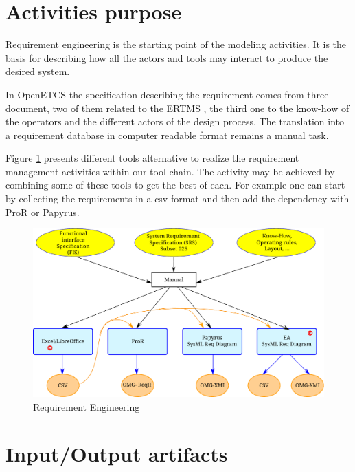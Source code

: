 \section{Activities purpose}
Requirement engineering is the starting point of the modeling
activities. It is the basis for describing how  all the actors and
tools may interact to produce the desired system. 

In OpenETCS the specification describing the requirement comes from
three document, two of them related to the \gls{ERTMS}
\cite{unisig_subset-026_2012,unisig_subset-034-_2012}, the third one
to the know-how of the operators and the different actors of the
design process. The translation into a requirement database in
computer readable format remains a manual task.

Figure \ref{fig:reqHand} presents different tools alternative to
realize the requirement management activities within our tool
chain. The activity may be achieved by combining some of these tools
to get the best of each. For example one can start by collecting the
requirements in a csv format and then add the dependency with ProR or
Papyrus.
\begin{figure}[htbp]
  \centering
  \includegraphics[width=\textwidth]{images/Req_Hand}
  \caption{Requirement Engineering}
  \label{fig:reqHand}
\end{figure}



\section{Input/Output artifacts}

